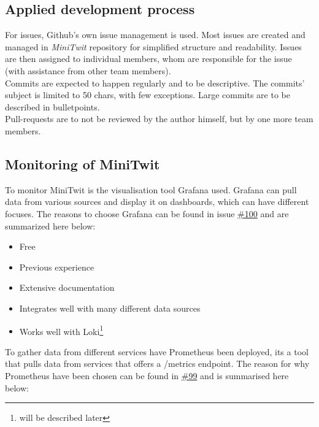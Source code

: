 \subsection{Applied development process}

For issues, Github's own issue management is used. Most issues are created and managed in \textit{MiniTwit} repository for simplified structure and readability. Issues are then assigned to individual members, whom are responsible for the issue (with assistance from other team members). \\
Commits are expected to happen regularly and to be descriptive. The commits' subject is limited to 50 chars, with few exceptions. Large commits are to be described in bulletpoints. \\
Pull-requests are to not be reviewed by the author himself, but by one more team members. \cite{contributing.md} \\






\subsection{Monitoring of MiniTwit}

To monitor MiniTwit is the visualisation tool Grafana used. Grafana can pull data from various sources and display it on dashboards, which can have different focuses. The reasons to choose Grafana can be found in issue \href{https://github.com/DevelOpsITU/MiniTwit/issues/100}{\#100} and are summarized here below:

\begin{itemize}
    \item Free
    \item Previous experience
    \item Extensive documentation
    \item Integrates well with many different data sources
    \item Works well with Loki\footnote{will be described later}
\end{itemize} 


To gather data from different services have Prometheus been deployed, its a tool that pulls data from services that offers a /metrics endpoint. The reason for why Prometheus have been chosen can be found in \href{https://github.com/DevelOpsITU/MiniTwit/issues/99}{\#99} and is summarised here below:

